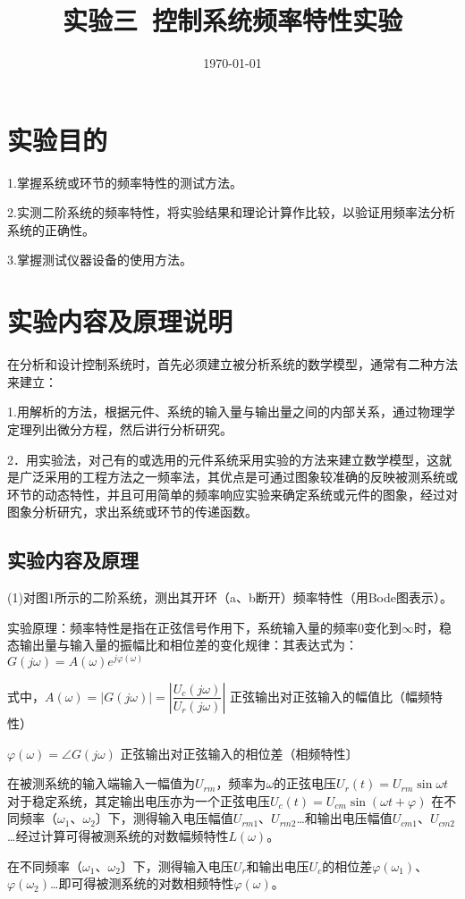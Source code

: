 \documentclass[UTF8,a4paper,10pt]{ctexart}
\title{\textbf{实验三\ 控制系统频率特性实验}}
\author{}
\date{\today}
\begin{document}
	\maketitle
\section{实验目的}
	1.掌握系统或环节的频率特性的测试方法。
	
	2.实测二阶系统的频率特性，将实验结果和理论计算作比较，以验证用频率法分析系统的正确性。
	
	3.掌握测试仪器设备的使用方法。
\section{实验内容及原理说明}
	在分析和设计控制系统时，首先必须建立被分析系统的数学模型，通常有二种方法来建立：
	
	1.用解析的方法，根据元件、系统的输入量与输出量之间的内部关系，通过物理学定理列出微分方程，然后讲行分析研究。
	
	2．用实验法，对己有的或选用的元件系统采用实验的方法来建立数学模型，这就是广泛采用的工程方法之一频率法，其优点是可通过图象较准确的反映被测系统或环节的动态特性，并且可用简单的频率响应实验来确定系统或元件的图象，经过对图象分析研宄，求出系统或环节的传递函数。
\subsection{实验内容及原理}
	(1)对图1所示的二阶系统，测出其开环（a、b断开）频率特性（用Bode图表示）。
	
	实验原理：频率特性是指在正弦信号作用下，系统输入量的频率0变化到$\infty$时，稳态输出量与输入量的振幅比和相位差的变化规律：其表达式为：$G(j\omega)=A(\omega)e^{j\varphi(\omega)}$
	
	式中，$A(\omega)=\left|G(j\omega)\right|=\left|\dfrac{U_{c}(j\omega)}{U_{r}(j\omega)}\right|$ 
	正弦输出对正弦输入的幅值比（幅频特性）
	
	$\varphi(\omega)=\angle G(j\omega)$ 正弦输出对正弦输入的相位差（相频特性〕
	
	在被测系统的输入端输入一幅值为$U_{rm}$，频率为$\omega$的正弦电压$U_{r}(t)=U_{rm}\sin\omega t$
	对于稳定系统，其定输出电压亦为一个正弦电压$U_{c}(t)=U_{cm}\sin(\omega t+\varphi)$
	在不同频率（$\omega_{1}、\omega_{2}$〕下，测得输入电压幅值$U_{rm1}$、$U_{rm2}$…和输出电压幅值$U_{cm1}$、$U_{cm2}$…经过计算可得被测系统的对数幅频特性$L(\omega)$。
	
	在不同频率（$\omega_{1}、\omega_{2}$〕下，测得输入电压$U_{r}$和输出电压$U_{c}$的相位差$\varphi(\omega_{1})$、$\varphi(\omega_{2})$…即可得被测系统的对数相频特性$\varphi(\omega)$。
	
\end{document}
